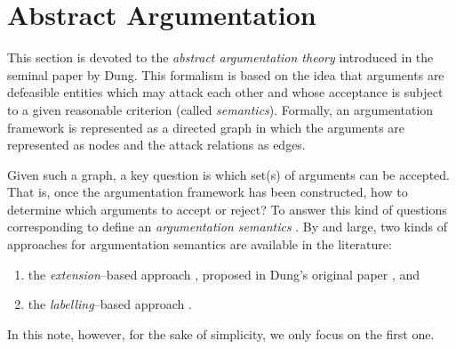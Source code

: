 \section{Abstract Argumentation}
\label{sec: abstract-argumentation}

This section is devoted to the \textit{abstract argumentation theory}  introduced in the seminal paper \cite{Dun1995} by  Dung.
% 
This formalism is based on the idea that arguments are defeasible entities which may attack each other and whose acceptance is subject to a given reasonable criterion (called \textit{semantics}).
% 
Formally, 
an argumentation framework is represented as a directed graph in which the arguments are represented as nodes and the attack relations as  edges.
% 


Given such a graph, 
a key question is which set(s) of arguments can be accepted.
That is, 
once the argumentation framework has been constructed, 
how to determine which arguments to accept or reject?
% 
To answer this kind of questions corresponding to define an \textit{argumentation semantics} .
%
% 
By and large, 
two kinds of approaches for argumentation semantics are available in the literature: 
\begin{enumerate}[itemsep=5pt,parsep=0pt,leftmargin=3em,topsep=5pt,label=(\arabic*)]
    \item the \textit{extension}--based approach , proposed in Dung's original paper \cite{Dun1995}, and
    \item the \textit{labelling}--based approach .
\end{enumerate}
% 
In this note, 
however, 
for the sake of simplicity,
we only focus on the first one.










